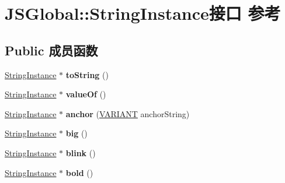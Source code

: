 \hypertarget{interface_j_s_global_1_1_string_instance}{}\section{J\+S\+Global\+:\+:String\+Instance接口 参考}
\label{interface_j_s_global_1_1_string_instance}
\subsection*{Public 成员函数}
\begin{DoxyCompactItemize}
\item 
\mbox{\label{interface_j_s_global_1_1_string_instance_ab3ccc77b987aff744f089b07ce1b0e44}} 
\hyperlink{interface_j_s_global_1_1_string_instance}{String\+Instance} $\ast$ {\bfseries to\+String} ()
\item 
\mbox{\label{interface_j_s_global_1_1_string_instance_af91cef50b8164ec0c20cccc049a10216}} 
\hyperlink{interface_j_s_global_1_1_string_instance}{String\+Instance} $\ast$ {\bfseries value\+Of} ()
\item 
\mbox{\label{interface_j_s_global_1_1_string_instance_aa772a130b681753e77c9b517742edafd}} 
\hyperlink{interface_j_s_global_1_1_string_instance}{String\+Instance} $\ast$ {\bfseries anchor} (\hyperlink{structtag_v_a_r_i_a_n_t}{V\+A\+R\+I\+A\+NT} anchor\+String)
\item 
\mbox{\label{interface_j_s_global_1_1_string_instance_a3f252e11e2d3ba0172dc9989271953a2}} 
\hyperlink{interface_j_s_global_1_1_string_instance}{String\+Instance} $\ast$ {\bfseries big} ()
\item 
\mbox{\label{interface_j_s_global_1_1_string_instance_a1470a9c986d6ce7f456283f2511710f1}} 
\hyperlink{interface_j_s_global_1_1_string_instance}{String\+Instance} $\ast$ {\bfseries blink} ()
\item 
\mbox{\label{interface_j_s_global_1_1_string_instance_a43183abf1a31f2a944efb0e2c49606c8}} 
\hyperlink{interface_j_s_global_1_1_string_instance}{String\+Instance} $\ast$ {\bfseries bold} ()

\end{DoxyCompactItemize}
